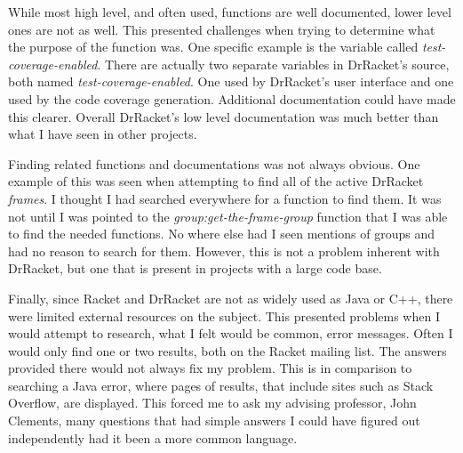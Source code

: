 While most high level, and often used, functions are well documented, lower level ones are not as well. This presented challenges when trying to determine what the purpose of the function was. One specific example is the variable called \emph{test-coverage-enabled}. There are actually two separate variables in DrRacket's source, both named \emph{test-coverage-enabled}. One used by DrRacket's user interface and one used by the code coverage generation. Additional documentation could have made this clearer. Overall DrRacket's low level documentation was much better than what I have seen in other projects.

Finding related functions and documentations was not always obvious. One example of this was seen when attempting to find all of the active DrRacket \emph{frames}. I thought I had searched everywhere for a function to find them. It was not until I was pointed to the \emph{group:get-the-frame-group} function that I was able to find the needed functions. No where else had I seen mentions of groups and had no reason to search for them. However, this is not a problem inherent with DrRacket, but one that is present in projects with a large code base.

Finally, since Racket and DrRacket are not as widely used as Java or C++, there were limited external resources on the subject. This presented problems when I would attempt to research, what I felt would be common, error messages. Often I would only find one or two results, both on the Racket mailing list. The answers provided there would not always fix my problem. This is in comparison to searching a Java error, where pages of results, that include sites such as Stack Overflow, are displayed. This forced me to ask my advising professor, John Clements, many questions that had simple answers I could have figured out independently had it been a more common language. 